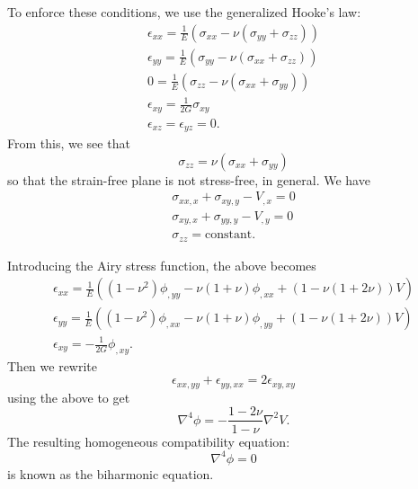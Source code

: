 To enforce these conditions, we use the generalized Hooke's law:
\begin{gather*}
  \epsilon_{x x} = \frac{1}{E} \left( \sigma_{ x x} - \nu \left( \sigma_{yy} + \sigma_{zz} \right) \right) \\
  \epsilon_{yy} = \frac{1}{E} \left( \sigma_{yy} - \nu \left( \sigma_{x x} + \sigma_{zz} \right) \right) \\
  0 = \frac{1}{E} \left( \sigma_{zz} - \nu \left( \sigma_{x x} + \sigma_{yy} \right) \right) \\
  \epsilon_{xy} = \frac{1}{2G} \sigma_{xy} \\
  \epsilon_{xz} = \epsilon_{yz} = 0
.\end{gather*}
From this, we see that
\begin{equation*}
  \sigma_{zz} = \nu \left( \sigma_{x x} + \sigma_{yy} \right)
\end{equation*}
so that the strain-free plane is not stress-free, in general.
We have
\begin{gather*}
  \sigma_{x x, x} + \sigma_{xy,y} - V_{,x} = 0 \\
  \sigma_{xy,x} + \sigma_{yy,y} - V_{,y} = 0  \\
  \sigma_{zz} = \text{constant}
.\end{gather*}

Introducing the Airy stress function, the above becomes
\begin{gather*}
  \epsilon_{x x} = \frac{1}{E} \left( \left( 1 - \nu^2 \right) \phi_{,yy} - \nu \left( 1 + \nu \right) \phi_{, x x} + \left( 1 - \nu (1 + 2\nu) \right) V \right) \\
  \epsilon_{yy} = \frac{1}{E} \left( \left( 1 - \nu^2 \right) \phi_{,x x} - \nu \left( 1 + \nu \right) \phi_{,yy} + \left( 1 - \nu \left( 1 + 2\nu \right) \right) V \right) \\
  \epsilon_{xy} = - \frac{1}{2G} \phi_{, xy}
.\end{gather*}
Then we rewrite
\begin{equation*}
  \epsilon_{x x , yy} + \epsilon_{yy, x x} = 2\epsilon_{xy,xy}
\end{equation*}
using the above to get
\begin{equation*}
  \nabla^{4}\phi = - \frac{1 - 2\nu}{1 - \nu} \nabla^2 V
.\end{equation*}
The resulting homogeneous compatibility equation:
\begin{equation*}
  \nabla^{4}\phi = 0
\end{equation*}
is known as the biharmonic equation.
